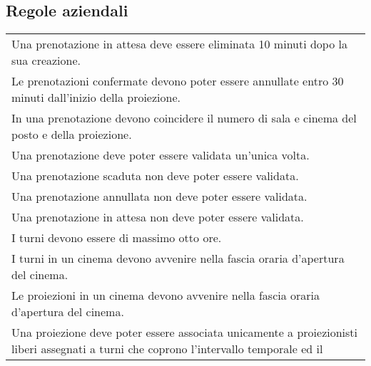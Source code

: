 \subsection*{Regole aziendali}
%
%
\begin{longtable}{|p{16.75cm}|}
    \hline
    \rowcolor{tblhdrcolor}
    \multicolumn{1}{|c|}{\textbf{Regole di vincolo}}
    \\\hline
    Una prenotazione in attesa deve essere eliminata 10 minuti dopo
    la sua creazione.                                           \\\hline
    Le prenotazioni confermate devono poter essere annullate entro 30 minuti
    dall'inizio della proiezione.                               \\\hline
    In una prenotazione devono coincidere il numero di sala e cinema del posto
    e della proiezione.                                         \\\hline
    Una prenotazione deve poter essere validata un'unica volta. \\\hline
    Una prenotazione scaduta non deve poter essere validata.    \\\hline
    Una prenotazione annullata non deve poter essere validata.  \\\hline
    Una prenotazione in attesa non deve poter essere validata.  \\\hline
    I turni devono essere di massimo otto ore.                  \\\hline
    I turni in un cinema devono avvenire nella fascia oraria d'apertura
    del cinema.                                                 \\\hline
    Le proiezioni in un cinema devono avvenire nella fascia oraria d'apertura
    del cinema.                                                 \\\hline
    Una proiezione deve poter essere associata unicamente a proiezionisti
    liberi assegnati a turni che coprono l'intervallo temporale ed il

\end{longtable}
